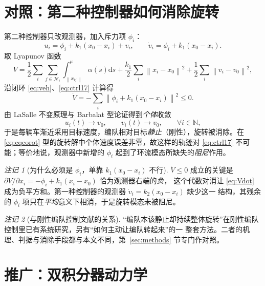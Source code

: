 \documentclass[11pt,a4paper]{ctexart}
\theoremstyle{plain}
\theoremstyle{definition}
\theoremstyle{remark}
\newtheorem{remark}{注记}
\newcommand{\NN}{\mathbb{N}}
\newcommand{\calN}{\mathcal{N}}
\newcommand{\norm}[1]{\left\|#1\right\|}
\newcommand{\dd}{\mathrm{d}}
\begin{document}
\section{对照：第二种控制器如何消除旋转}
\label{sec:second}

第二种控制器只改观测器，加入斥力项 $\phi_i$：
\begin{equation}
  \boxed{\;
  u_i=\phi_i+k_1(x_0-x_i)+v_i,\qquad
  \dot v_i=\phi_i+k_1(x_0-x_i).\;}
  \label{eq:ctrl17}
\end{equation}
取 Lyapunov 函数
\begin{equation}
  V=\frac12\sum_i\sum_{j\in\calN_i}\int_{\norm{x_{ij}}}^{\mu}\alpha(s)\dd s
   +\frac{k_1}{2}\sum_i\norm{x_i-x_0}^2
   +\frac12\sum_i\norm{v_i-v_0}^2 ,
  \label{eq:lyap}
\end{equation}
沿闭环 \eqref{eq:veh}、\eqref{eq:ctrl17} 计算得
\begin{equation}
  \dot V=-\sum_i\norm{\phi_i+k_1(x_0-x_i)}^2\le0 .
  \label{eq:Vdot}
\end{equation}
由 LaSalle 不变原理与 Barbalat 型论证得到\emph{个体}收敛
\begin{equation}
  u_i(t)\to v_0,\qquad v_i(t)\to v_0,\qquad\forall i\in\NN ,
\end{equation}
于是每辆车渐近采用目标速度，编队相对目标\emph{静止}（刚性），旋转被消除。在 \eqref{eq:eqcorot}
型的旋转解中个体速度误差非零，故这样的轨迹对 \eqref{eq:ctrl17} 不可能；等价地说，观测器中新增的
$\phi_i$ 起到了环流模态所缺失的\emph{阻尼}作用。

\begin{remark}[为什么必须是 $\phi_i$，单靠 $k_1(x_0-x_i)$ 不行]
$\dot V\le0$ 成立的关键是 $\partial V/\partial x_i=-\phi_i+k_1(x_i-x_0)$ 恰为观测器右端的\emph{负}，
这个代数对消让 \eqref{eq:Vdot} 成为负平方和。第一种控制器的观测器 $\dot v_i=k_2(x_0-x_i)$ 缺少这一
结构，其残余的 $\phi_i$ 项只在\emph{平均}意义下相消，于是旋转模态未被阻尼。
\end{remark}

\begin{remark}[与刚性编队控制文献的关系]
“编队本该静止却持续整体旋转”在刚性编队控制里已有系统研究，另有“如何主动让编队转起来”的一
整套方法。二者的机理、判据与消除手段都与本文不同，第~\ref{sec:methods} 节专门作对照。
\end{remark}

\section{推广：双积分器动力学}
\label{sec:double}
\end{document}
